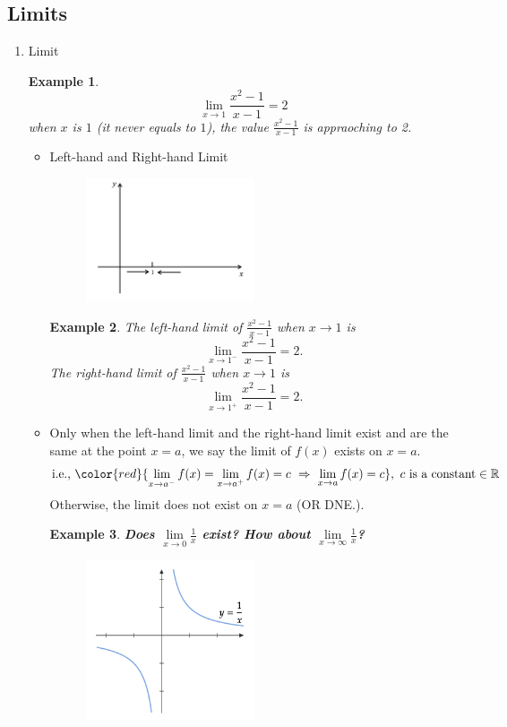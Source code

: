 \documentclass[12pt, a4paper]{article}
\newtheorem{example}{Example}[subsection]
\begin{document}
\subsection{Limits}
\begin{enumerate}
    \item Limit
    \begin{example}
        $$\lim_{x\rightarrow 1}\frac{x^2-1}{x-1}=2$$
        when $x$ is {\color{red}{approaching to}} $1$ (it never equals to $1$), the value $\frac{x^2-1}{x-1}$ is appraoching to 2.
    \end{example}
    \begin{itemize}
        \item Left-hand and Right-hand Limit 
        \begin{figure}[H]
            \centering 
            \includegraphics[width=0.5\textwidth]{Fig.5.1.jpg} 
        \end{figure}
        \begin{example}
            The left-hand limit of $\frac{x^2-1}{x-1}$ when $x \rightarrow 1$ is $$\lim_{x \rightarrow 1^-}\frac{x^2-1}{x-1}=2.$$
            The right-hand limit of $\frac{x^2-1}{x-1}$ when $x \rightarrow 1$ is $$\lim_{x \rightarrow 1^+}\frac{x^2-1}{x-1}=2.$$
        \end{example}
        \item Only when the left-hand limit and the right-hand limit exist and are the same at the point $x=a$, we say the limit of $f(x)$ exists on $x=a$. 
        $$\text{i.e., }{\color{red}{\lim_{x\rightarrow a^-}f(x)=\lim_{x\rightarrow a^+}f(x)=c\ \Rightarrow\ \lim_{x\rightarrow a}f(x)=c}},\ c\text{ is a constant}\in \mathbb{R}$$
        Otherwise, the limit does not exist on $x=a$ {\color{green}(OR DNE.)}.
        \begin{example}
            \textbf{Does $\lim\limits_{x\rightarrow 0}\frac{1}{x}$ exist? How about $\lim\limits_{x\rightarrow \infty}\frac{1}{x}$?}
            \begin{figure}[H]
                \centering 
                \includegraphics[width=0.5\textwidth]{Fig.5.2.jpg} 

\end{figure}
\end{example}
\end{itemize}
\end{enumerate}
\end{document}
